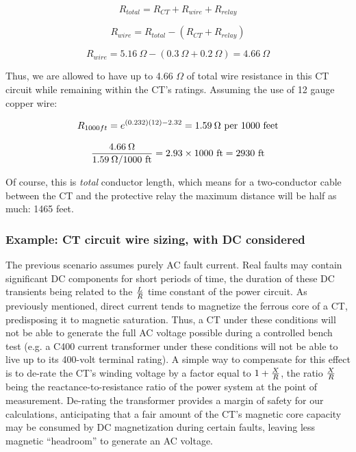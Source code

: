 $$R_{total} = R_{CT} + R_{wire} + R_{relay}$$

$$R_{wire} = R_{total} - (R_{CT} + R_{relay})$$

$$R_{wire} = 5.16 \> \Omega - (0.3 \> \Omega + 0.2 \> \Omega) = 4.66 \> \Omega$$

Thus, we are allowed to have up to 4.66 $\Omega$ of total wire resistance in this CT circuit while remaining within the CT's ratings.  Assuming the use of 12 gauge copper wire:

$$R_{1000ft} = e^{(0.232) (12) - 2.32} = 1.59 \> \Omega \hbox{ per 1000 feet}$$

$${4.66 \> \Omega \over 1.59 \> \Omega / \hbox{1000 ft}} = 2.93 \times \hbox{1000 ft} = 2930 \hbox{ ft}$$

Of course, this is \textit{total} conductor length, which means for a two-conductor cable between the CT and the protective relay the maximum distance will be half as much: 1465 feet.










\filbreak
\subsubsection{Example: CT circuit wire sizing, with DC considered}

The previous scenario assumes purely AC fault current.  Real faults may contain significant DC components for short periods of time, the duration of these DC transients being related to the $L \over R$ time constant of the power circuit.  As previously mentioned, direct current tends to magnetize the ferrous core of a CT, predisposing it to magnetic saturation.  Thus, a CT under these conditions will not be able to generate the full AC voltage possible during a controlled bench test (e.g. a C400 current transformer under these conditions will not be able to live up to its 400-volt terminal rating).  A simple way to compensate for this effect is to de-rate the CT's winding voltage by a factor equal to $1 + {X \over R}$, the ratio $X \over R$ being the reactance-to-resistance ratio of the power system at the point of measurement.  De-rating the transformer provides a margin of safety for our calculations, anticipating that a fair amount of the CT's magnetic core capacity may be consumed by DC magnetization during certain faults, leaving less magnetic ``headroom'' to generate an AC voltage.

